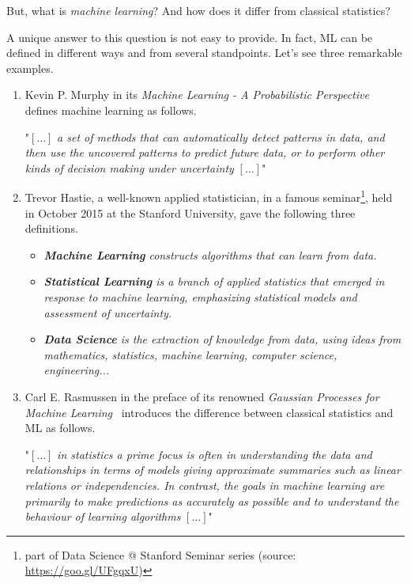 But, what is \textit{machine learning}? And how does it differ from classical statistics?

A unique answer to this question is not easy to provide. In fact, ML can be defined in different ways and from several standpoints. Let's see three remarkable examples.

\begin{enumerate}
  \item Kevin P. Murphy in its \emph{Machine Learning - A Probabilistic Perspective}~\cite{murphy2012machine} defines machine learning as follows.

  \begin{displayquote}
  "$[\dots]$ \emph{a set of methods that can automatically detect patterns in data, and then use the uncovered patterns to predict future data, or to perform other kinds of decision making under uncertainty} $[\dots]$"
  \end{displayquote}

  \item Trevor Hastie, a well-known applied statistician, in a famous seminar\footnote{part of Data Science @ Stanford Seminar series (source: \url{https://goo.gl/UFgqxU})}, held in October 2015 at the Stanford University, gave the following three definitions.

  \begin{displayquote}
    \begin{itemize}
      \item[] \emph{{\bf Machine Learning} constructs algorithms that can learn from data.}
      \item[] \emph{{\bf Statistical Learning}  is a branch of applied statistics that emerged in response to machine learning, emphasizing statistical models and assessment of uncertainty.}
      \item[] \emph{{\bf Data Science}  is the extraction of knowledge from data, using ideas from mathematics, statistics, machine learning, computer science, engineering...}
    \end{itemize}
  \end{displayquote}

  \item Carl E. Rasmussen in the preface of its renowned \emph{Gaussian Processes for Machine Learning}~\cite{rasmussen2006gaussian} introduces the difference between classical statistics and ML as follows.

  \begin{displayquote}
    "$[\dots]$ \emph{in statistics a prime focus is often in understanding the data and relationships in terms of models giving approximate summaries such as linear relations or independencies. In contrast, the goals in machine learning are primarily to make predictions as accurately as possible and to understand the behaviour of learning algorithms} $[\dots]$"
  \end{displayquote}

\end{enumerate}

